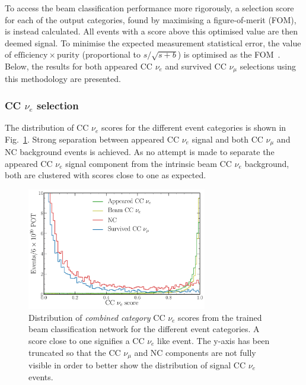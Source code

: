 To access the beam classification performance more rigorously, a selection score for each of the
output categories, found by maximising a figure-of-merit (FOM), is instead calculated. All events
with a score above this optimised value are then deemed signal. To minimise the expected
measurement statistical error, the value of $\mathrm{efficiency}\times\mathrm{purity}$
(proportional to $s/\sqrt{s+b}$) is optimised as the FOM~\cite{list2002}. Below, the results for
both appeared CC $\nu_{e}$ and survived CC $\nu_{\mu}$ selections using this methodology are
presented.

\subsubsection*{CC $\nu_{e}$ selection} %

The distribution of CC $\nu_{e}$ scores for the different event categories is shown in
Fig.~\ref{fig:final_beam_nuel_outputs}. Strong separation between appeared CC $\nu_{e}$ signal and
both CC $\nu_{\mu}$ and NC background events is achieved. As no attempt is made to separate the
appeared CC $\nu_{e}$ signal component from the intrinsic beam CC $\nu_{e}$ background, both are
clustered with scores close to one as expected.

\begin{figure} %
    \includegraphics[width=0.7\textwidth]{diagrams/7-results/final_beam_nuel_outputs.pdf}
    \caption[Distribution of CC $\nu_{e}$ scores from the trained beam classification network]
    {Distribution of \emph{combined category} CC $\nu_{e}$ scores from the trained beam
        classification network for the different event categories. A score close to one signifies
        a CC $\nu_{e}$ like event. The y-axis has been truncated so that the CC $\nu_{\mu}$ and NC
        components are not fully visible in order to better show the distribution of signal CC
        $\nu_{e}$ events.}
    \label{fig:final_beam_nuel_outputs}
\end{figure}


